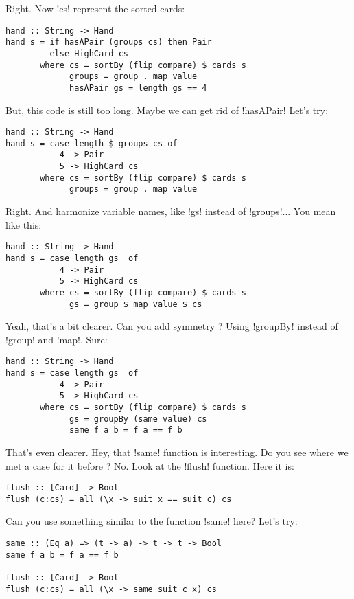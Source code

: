 \lhA \success Right. Now \il!cs! represent the sorted cards:
\begin{lstlisting}[frame=single]
hand :: String -> Hand
hand s = if hasAPair (groups cs) then Pair
         else HighCard cs
       where cs = sortBy (flip compare) $ cards s
             groups = group . map value
             hasAPair gs = length gs == 4 
\end{lstlisting} %
\success But, this code is still too long.
\lhN Maybe we can get rid of \il!hasAPair!
\lhA \success Let's try:
\begin{lstlisting}[frame=single]
hand :: String -> Hand
hand s = case length $ groups cs of
           4 -> Pair
           5 -> HighCard cs 
       where cs = sortBy (flip compare) $ cards s
             groups = group . map value
\end{lstlisting}
\success Right.
\lhN And harmonize variable names, like \il!gs! instead of \il!groups!...
\lhA \success You mean like this:
\begin{lstlisting}[frame=single]
hand :: String -> Hand
hand s = case length gs  of
           4 -> Pair
           5 -> HighCard cs 
       where cs = sortBy (flip compare) $ cards s
             gs = group $ map value $ cs
\end{lstlisting} %
\success Yeah, that's a bit clearer.
\lhN Can you add symmetry ? Using \il!groupBy! instead of \il!group! and \il!map!.
\lhA \success Sure:
\begin{lstlisting}[frame=single]
hand :: String -> Hand
hand s = case length gs  of
           4 -> Pair
           5 -> HighCard cs 
       where cs = sortBy (flip compare) $ cards s
             gs = groupBy (same value) cs
             same f a b = f a == f b
\end{lstlisting} %
\success That's even clearer.
\lhN Hey, that \il!same! function is interesting. Do you see where we met a case for it before ?
\lhA No.
\lhN Look at the \il!flush! function.
\lhA Here it is:
\begin{lstlisting}[frame=single]
flush :: [Card] -> Bool
flush (c:cs) = all (\x -> suit x == suit c) cs
\end{lstlisting}
\lhN Can you use something similar to the function \il!same! here?
\lhA Let's try:
\begin{lstlisting}[frame=single]
same :: (Eq a) => (t -> a) -> t -> t -> Bool
same f a b = f a == f b

flush :: [Card] -> Bool
flush (c:cs) = all (\x -> same suit c x) cs

\end{lstlisting}
